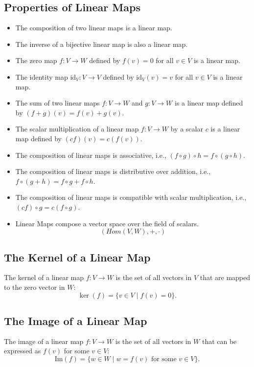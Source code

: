 \subsection{Properties of Linear Maps}
\begin{itemize}[label=\(-\)]
    \item The composition of two linear maps is a linear map.
    \item The inverse of a bijective linear map is also a linear map.
    \item The zero map \( f: V \to W \) defined by \( f(v) = 0 \) 
    for all \( v \in V \) is a linear map.
    \item The identity map \( \text{id}_V: V \to V \) defined by \( \text{id}_V(v) = v \) for all \( v \in V \) is a linear map.
    \item The sum of two linear maps \( f: V \to W \) 
    and \( g: V \to W \) is a linear map defined by \( (f + g)(v) = f(v) + g(v) \).
    \item The scalar multiplication of a linear map \( f: V \to W \) by a scalar \( c \) is a linear map defined by \( (cf)(v) = c(f(v)) \).
    \item The composition of linear maps is associative, i.e., \( (f \circ g) \circ h = f \circ (g \circ h) \).
    \item The composition of linear maps is distributive over addition, i.e., \( f \circ (g + h) = f \circ g + f \circ h \).
    \item The composition of linear maps is compatible with scalar multiplication, i.e., \( (cf) \circ g = c(f \circ g) \).
    \item Linear Maps compose a vector space 
    over the field of scalars.
    \[
    (Hom(V,W), +, \cdot )
    \]
\end{itemize}

\subsection{The Kernel of a Linear Map}
The kernel of a linear map \( f: V \to W \) is the set of all vectors in \( V \) that are mapped to the zero vector in \( W \):
    \[
    \ker(f) = \{ v \in V \mid f(v) = 0 \}.
    \]

\subsection{The Image of a Linear Map}
The image of a linear map \( f: V \to W \) is the set of all vectors in \( W \) that can be expressed as \( f(v) \) for some \( v \in V \):
    \[
    \text{Im}(f) = \{ w \in W \mid w = f(v) \text{ for some } v \in V \}.
    \]
 
